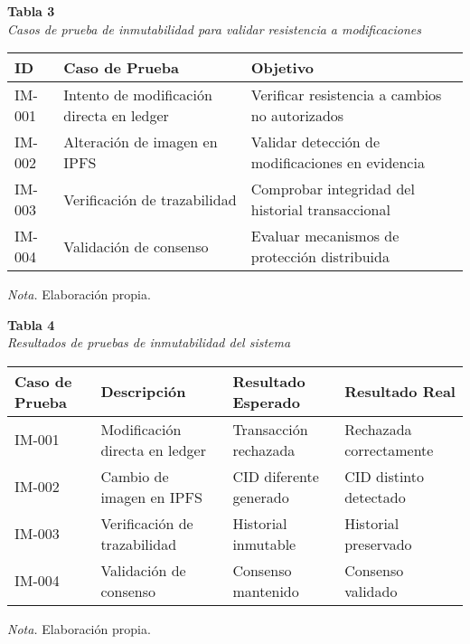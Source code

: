 \begin{table}[htbp]
    \begin{flushleft}
        \textbf{Tabla 3}\\[2em]
        \textit{Casos de prueba de inmutabilidad para validar resistencia a modificaciones}
    \end{flushleft}
    \vspace{1em}
    \centering
    \begin{tabular}{p{2cm} p{6cm} p{4cm}}
        \toprule
        \textbf{ID} & \textbf{Caso de Prueba} & \textbf{Objetivo} \\
        \midrule
        IM-001 & Intento de modificación directa en ledger & Verificar resistencia a cambios no autorizados \\
        IM-002 & Alteración de imagen en IPFS & Validar detección de modificaciones en evidencia \\
        IM-003 & Verificación de trazabilidad & Comprobar integridad del historial transaccional \\
        IM-004 & Validación de consenso & Evaluar mecanismos de protección distribuida \\
        \bottomrule
    \end{tabular}
    \vspace{2em}
    \begin{flushleft}
        \textit{Nota.} Elaboración propia.
    \end{flushleft}
    \label{tab:casos_prueba_inmutabilidad}
\end{table}

\begin{table}[htbp]
    \begin{flushleft}
        \textbf{Tabla 4}\\[2em]
        \textit{Resultados de pruebas de inmutabilidad del sistema}
    \end{flushleft}
    \vspace{1em}
    \centering
    \begin{tabular}{p{3cm} p{4cm} p{3cm} p{3cm}}
        \toprule
        \textbf{Caso de Prueba} & \textbf{Descripción} & \textbf{Resultado Esperado} & \textbf{Resultado Real} \\
        \midrule
        IM-001 & Modificación directa en ledger & Transacción rechazada & Rechazada correctamente \\
        IM-002 & Cambio de imagen en IPFS & CID diferente generado & CID distinto detectado \\
        IM-003 & Verificación de trazabilidad & Historial inmutable & Historial preservado \\
        IM-004 & Validación de consenso & Consenso mantenido & Consenso validado \\
        \bottomrule
    \end{tabular}
    \vspace{2em}
    \begin{flushleft}
        \textit{Nota.} Elaboración propia.
    \end{flushleft}
    \label{tab:resultados_inmutabilidad}
\end{table} 